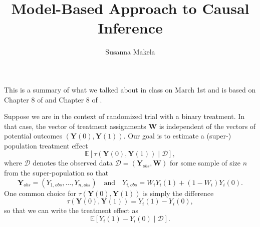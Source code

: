 \documentclass[10pt,a4paper]{article}
\author{Susanna Makela}
\title{Model-Based Approach to Causal Inference}
\newcommand\independent{\protect\mathpalette{\protect\independenT}{\perp}}
\def\independenT#1#2{\mathrel{\rlap{$#1#2$}\mkern2mu{#1#2}}}
\begin{document}
\maketitle

This is a summary of what we talked about in class on March 1st and is based on Chapter 8 of \cite{imbens_rubin} and Chapter 8 of \cite{bda3}.


Suppose we are in the context of randomized trial with a binary treatment. In that case, the vector of treatment assignments $\mathbf{W}$ is independent of the vectors of potential outcomes $(\mathbf{Y}(0), \mathbf{Y}(1))$. Our goal is to estimate a (super-) population treatment effect
\begin{equation}\label{eq:goal}
	\mathbb{E} \left[ \tau(\mathbf{Y}(0), \mathbf{Y}(1)) \mid \mathcal{D} \right],
\end{equation}
where $\mathcal{D}$ denotes the observed data $\mathcal{D} = (\mathbf{Y}_{obs}, \mathbf{W})$ for some sample of size $n$ from the super-population so that
\begin{equation}\label{eq:y_obs}
	\mathbf{Y}_{obs} = (Y_{1, obs}, \ldots, Y_{n, obs}) \quad \text{and} \quad Y_{i, obs} = W_i Y_i(1) + (1 - W_i) Y_i(0).
\end{equation}
One common choice for $\tau(\mathbf{Y}(0), \mathbf{Y}(1))$ is simply the difference
\[
	\tau(\mathbf{Y}(0), \mathbf{Y}(1)) = Y_i(1) - Y_i(0),
\]
so that we can write the treatment effect as
\[
	\mathbb{E} \left[ Y_i(1) - Y_i(0) \mid \mathcal{D} \right].
\]
\end{document}
